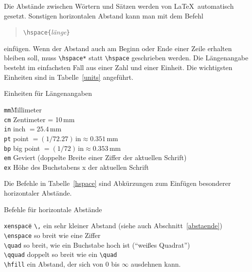 Die Abstände zwischen Wörtern und Sätzen werden von \LaTeX\ 
automatisch gesetzt.
Sonstigen horizontalen Abstand kann man mit dem Befehl
\begin{verse}
\verb|\hspace{|\textit{länge}\verb|}|
\end{verse}
einfügen.
Wenn der Abstand auch am Beginn oder Ende einer Zeile
erhalten bleiben soll, muss \verb|\hspace*| statt \verb|\hspace|
geschrieben werden.
Die Längenangabe besteht im einfachsten Fall aus einer Zahl
und einer Einheit.  Die wichtigsten Einheiten sind in
Tabelle~\ref{units} angeführt.
\begin{table}[b]
\caption{Einheiten für Längenangaben} \label{units}
\begin{lminipage}{11cm}
\begin{tabbing}
\texttt{mm}\qquad \= Millimeter                               \\
\texttt{cm} \> Zentimeter = 10\,mm                            \\
\texttt{in} \> inch \(= 25.4\,\mathrm{mm} \)                  \\
\texttt{pt} \> point \( =(1/72.27)\,\mathrm{in}
                        \approx 0.351\,\mathrm{mm}\)          \\
\texttt{bp} \> big point \( =(1/72)\,\mathrm{in}
                            \approx 0.353\,\mathrm{mm} \)      \\
\texttt{em} \> Geviert (doppelte Breite einer Ziffer der aktuellen Schrift)\\
\texttt{ex} \> Höhe des Buchstabens x der aktuellen Schrift
\end{tabbing}                    
\end{lminipage}
\end{table}
Die Befehle in Tabelle~\ref{hspace} sind Abkürzungen zum Einfügen
besonderer horizontaler Abstände.
\begin{table}[t]
\caption{Befehle für horizontale Abstände} \label{hspace}
\begin{lminipage}{13cm}
\begin{tabbing}
\texttt{xenspace}\qquad \= \kill
\verb|\,|       \> ein sehr kleiner Abstand (siehe auch Abschnitt~\ref{abstaende})\\
\verb|\enspace| \> so breit wie eine Ziffer \\
\verb|\quad|    \> so breit, wie ein Buchstabe hoch ist
                   ("`weißes Quadrat"') \\
\verb|\qquad|   \> doppelt so breit wie ein \verb|\quad| \\
\verb|\hfill|   \> ein Abstand, der sich von 0 bis \(\infty\)
                   ausdehnen kann.
\end{tabbing}
\end{lminipage}
\end{table}
